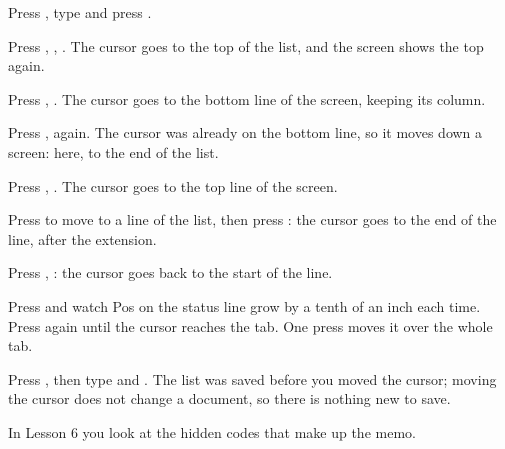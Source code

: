 \begin{WPSteps}
\item Press , type  and press
.
\end{WPSteps}

\begin{WPSteps}
\item Press , , .  The cursor goes
to the top of the list, and the screen shows the top again.
\item Press , .  The cursor goes to the bottom
line of the screen, keeping its column.
\end{WPSteps}
\begin{WPSteps}[resume]
\item Press ,  again.  The cursor was already on
the bottom line, so it moves down a screen: here, to the end of the list.
\item Press , .  The cursor goes to the top line of
the screen.
\end{WPSteps}

\begin{WPSteps}[resume]
\item Press  to move to a line of the list, then press
: the cursor goes to the end of the line, after the extension.
\item Press , : the cursor goes back to the start
of the line.
\item Press  and watch Pos on the status line grow by a tenth
of an inch each time.  Press  again until the cursor reaches
the tab.  One press moves it over the whole tab.
\end{WPSteps}

\begin{WPSteps}[resume]
\item Press , then type  and .  The
list was saved before you moved the cursor; moving the cursor does not
change a document, so there is nothing new to save.
\end{WPSteps}
\EndReplay
In Lesson 6 you look at the hidden codes that make up the memo.
